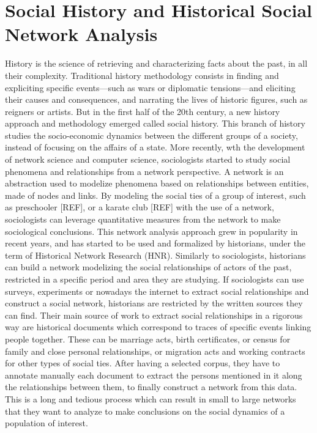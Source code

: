 \section{Social History and Historical Social Network Analysis}

History is the science of retrieving and characterizing facts about the past, in all their complexity. Traditional history methodology consists in finding and expliciting specific events---such as wars or diplomatic tensions---and eliciting their causes and consequences, and narrating the lives of historic figures, such as reigners or artists. But in the first half of the 20th century, a new history approach and methodology emerged called social history. This branch of history studies the socio-economic dynamics between the different groups of a society, instead of focusing on the affairs of a state.
More recently, wth the development of network science and computer science, sociologists started to study social phenomena and relationships from a network perspective. A network is an abstraction used to modelize phenomena based on relationships between entities, made of nodes and links. By modeling the social ties of a group of interest, such as preschooler [REF], or a karate club [REF] with the use of a network, sociologists can leverage quantitative measures from the network to make sociological conclusions.
This network analysis approach grew in popularity in recent years, and has started to be used and formalized by historians, under the term of Historical Network Research (HNR). Similarly to sociologists, historians can build a network modelizing the social relationships of actors of the past, restricted in a specific period and area they are studying. If sociologists can use surveys, experiments or nowadays the internet to extract social relationships and construct a social network, historians are restricted by the written sources they can find. Their main source of work to extract social relationships in a rigorous way are historical documents which correspond to traces of specific events linking people together. These can be marriage acts, birth certificates, or census for family and close personal relationships, or migration acts and working contracts for other types of social ties. After having a selected corpus, they have to annotate manually each document to extract the persons mentioned in it along the relationships between them, to finally construct a network from this data. This is a long and tedious process which can result in small to large networks that they want to analyze to make conclusions on the social dynamics of a population of interest.
